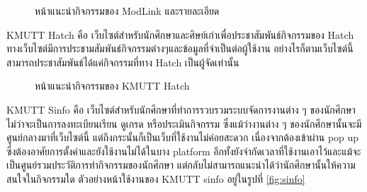 \documentclass[14pt,oneside,openright,a4paper]{cpe-thai-project}
\begin{document}
  \begin{figure}[!h]\centering
    \setlength{\fboxrule}{0.5mm} %
    \setlength{\fboxsep}{0.5cm}
    \caption{หน้าแนะนำกิจกรรมของ ModLink และรายละเอียด}\label{fig:modlink}
    \end{figure}

\newpage

KMUTT Hatch คือ เว็บไซต์สำหรับนักศึกษาและศิษย์เก่าเพื่อประชาสัมพันธ์กิจกรรมของ Hatch ทางเว็บไซต์มีการประชามสัมพันธ์กิจกรรมต่างๆและข้อมูลที่จำเป็นต่อผู้ใช้งาน อย่างไรก็ตามเว็บไซต์นี้สามารถประชาสัมพันธ์ได้แค่กิจกรรมที่ทาง Hatch เป็นผู้จัดเท่านั้น

  \begin{figure}[!h]\centering
    \setlength{\fboxrule}{0.5mm} %
    \setlength{\fboxsep}{0.5cm}
    \caption{หน้าแนะนำกิจกรรมของ KMUTT Hatch}\label{fig:hatch}
    \end{figure}



KMUTT Sinfo คือ เว็บไซต์สำหรับนักศึกษาที่ทำการรวบรวมระบบจัดการงานต่าง ๆ ของนักศึกษาไม่ว่าจะเป็นการลงทะเบียนเรียน ดูเกรด หรือประเมินกิจกรรม ซึ่งแม้ว่างานต่าง ๆ ของนักศึกษานั้นจะมีศูนย์กลางมาที่เว็บไซต์นี้ แต่ถึงกระนั้นก็เป็นเว็บที่ใช้งานไม่ค่อยสะดวก เนื่องจากต้องเข้าผ่าน pop up ซึ่งต้องอาศัยการตั้งค่าและยังใช้งานไม่ได้ในบาง platform อีกทั้งยังจำกัดเวลาที่ใช้งานเอาไว้และแม้จะเป็นศูนย์รวมประวัติการทำกิจกรรมของนักศึกษา แต่กลับไม่สามารถแนะนำได้ว่านักศึกษานั้นให้ความสนใจในกิจกรรมใด ตัวอย่างหน้าใช้งานของ KMUTT sinfo อยู่ในรูปที่ \ref{fig:sinfo}
\end{document}

